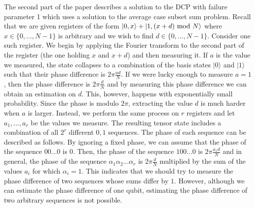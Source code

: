 \documentclass[11pt]{article}
\def\mod{{\rm mod}}
\newcommand\ket[1]{{ |{#1} \rangle }}
\begin{document}
The second part of the paper describes a solution to the DCP with failure parameter 1 which uses a solution to the
average case subset sum problem. Recall that we are given registers of the form $\ket{0,x}+\ket{1,(x+d)~\mod~N}$ where
$x\in \{0,\ldots,N-1\}$ is arbitrary and we wish to find $d\in \{0,\ldots,N-1\}$. Consider one such register. We begin
by applying the Fourier transform to the second part of the register (the one holding $x$ and $x+d$) and then measuring
it. If $a$ is the value we measured, the state collapses to a combination of the basis states $\ket{0}$ and $\ket{1}$
such that their phase difference is $2\pi \frac{ad}{N}$. If we were lucky enough to measure $a=1$, then the phase
difference is $2\pi \frac{d}{N}$ and by measuring this phase difference we can obtain an estimation on $d$. This,
however, happens with exponentially small probability. Since the phase is modulo $2\pi$, extracting the value $d$ is
much harder when $a$ is larger. Instead, we perform the same process on $r$ registers and let $a_1,\ldots,a_r$ be the
values we measure. The resulting tensor state includes a combination of all $2^r$ different $0,1$ sequences. The phase
of each sequence can be described as follows. By ignoring a fixed phase, we can assume that the phase of the sequence
$00\ldots 0$ is $0$. Then, the phase of the sequence $100\ldots 0$ is $2\pi \frac{a_1 d}{N}$ and in general, the phase
of the sequence $\alpha_1\alpha_2\ldots\alpha_r$ is $2\pi \frac{d}{N}$ multiplied by the sum of the values $a_i$ for
which $\alpha_i=1$. This indicates that we should try to measure the phase difference of two sequences whose sums
differ by $1$. However, although we can estimate the phase difference of one qubit, estimating the phase difference of
two arbitrary sequences is not possible.
\end{document}
